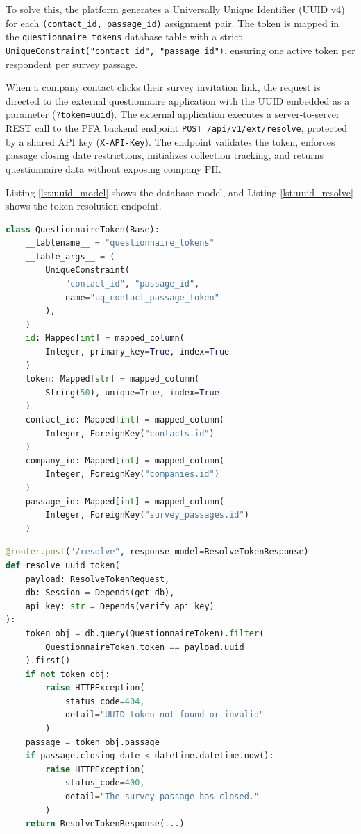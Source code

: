 \documentclass[12pt,a4paper]{report}
\begin{document}
To solve this, the platform generates a Universally Unique Identifier (UUID v4) for each \texttt{(contact\_id, passage\_id)} assignment pair. The token is mapped in the \texttt{questionnaire\_tokens} database table with a strict \texttt{UniqueConstraint("contact\_id", "passage\_id")}, ensuring one active token per respondent per survey passage.

When a company contact clicks their survey invitation link, the request is directed to the external questionnaire application with the UUID embedded as a parameter (\texttt{?token=uuid}). The external application executes a server-to-server REST call to the PFA backend endpoint \texttt{POST /api/v1/ext/resolve}, protected by a shared API key (\texttt{X-API-Key}). The endpoint validates the token, enforces passage closing date restrictions, initializes collection tracking, and returns questionnaire data without exposing company PII.

Listing \ref{lst:uuid_model} shows the database model, and Listing \ref{lst:uuid_resolve} shows the token resolution endpoint.

\begin{lstlisting}[language=Python, caption={Questionnaire Token Database Model (\texttt{app/models/questionnaire\_token.py})}, label={lst:uuid_model}]
class QuestionnaireToken(Base):
    __tablename__ = "questionnaire_tokens"
    __table_args__ = (
        UniqueConstraint(
            "contact_id", "passage_id", 
            name="uq_contact_passage_token"
        ),
    )
    id: Mapped[int] = mapped_column(
        Integer, primary_key=True, index=True
    )
    token: Mapped[str] = mapped_column(
        String(50), unique=True, index=True
    )
    contact_id: Mapped[int] = mapped_column(
        Integer, ForeignKey("contacts.id")
    )
    company_id: Mapped[int] = mapped_column(
        Integer, ForeignKey("companies.id")
    )
    passage_id: Mapped[int] = mapped_column(
        Integer, ForeignKey("survey_passages.id")
    )
\end{lstlisting}

\begin{lstlisting}[language=Python, caption={External Token Resolution Endpoint (\texttt{app/api/v1/external\_integration.py})}, label={lst:uuid_resolve}]
@router.post("/resolve", response_model=ResolveTokenResponse)
def resolve_uuid_token(
    payload: ResolveTokenRequest,
    db: Session = Depends(get_db),
    api_key: str = Depends(verify_api_key)
):
    token_obj = db.query(QuestionnaireToken).filter(
        QuestionnaireToken.token == payload.uuid
    ).first()
    if not token_obj:
        raise HTTPException(
            status_code=404, 
            detail="UUID token not found or invalid"
        )
    passage = token_obj.passage
    if passage.closing_date < datetime.datetime.now():
        raise HTTPException(
            status_code=400, 
            detail="The survey passage has closed."
        )
    return ResolveTokenResponse(...)
\end{lstlisting}
\end{document}
